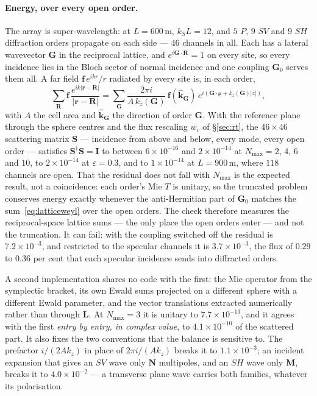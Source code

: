 \documentclass[11pt,a4paper]{article}
\begin{document}
\paragraph{Energy, over every open order.}  The array is super-wavelength:
at $L=600$\,m, $k_SL=12$, and $5$ $P$, $9$ $SV$ and $9$ $SH$ diffraction orders
propagate on each side --- $46$ channels in all.  Each has a lateral wavevector
$\mathbf{G}$ in the reciprocal lattice, and $e^{i\mathbf{G}\cdot\mathbf{R}}=1$ on
every site, so every incidence lies in the Bloch sector of normal incidence and
one coupling $\mathbf{G}_0$ serves them all.  A far field $\mathbf{f}\,e^{ikr}/r$
radiated by every site is, in each order,
\begin{equation}\label{eq:latticeweyl}
  \sum_{\mathbf{R}}\mathbf{f}\,\frac{e^{ik|\mathbf{r}-\mathbf{R}|}}{|\mathbf{r}-\mathbf{R}|}
  = \sum_{\mathbf{G}}\frac{2\pi i}{A\,k_z(\mathbf{G})}\,
    \mathbf{f}(\hat{\mathbf{k}}_{\mathbf{G}})\,
    e^{i(\mathbf{G}\cdot\boldsymbol{\rho}+k_z(\mathbf{G})|z|)},
\end{equation}
with $A$ the cell area and $\hat{\mathbf{k}}_{\mathbf{G}}$ the direction of order
$\mathbf{G}$.  With the reference plane through the sphere centres and the flux
rescaling $w_c$ of \S\ref{sec:rt}, the $46\times46$ scattering matrix
$\mathbf{S}$ --- incidence from above and below, every mode, every open order ---
satisfies $\mathbf{S}^{\dagger}\mathbf{S}=\mathbf{I}$ to between
$6\times10^{-16}$ and $2\times10^{-14}$ at $N_{\max}=2$, $4$, $6$ and $10$, to
$2\times10^{-14}$ at $\varepsilon=0.3$, and to $1\times10^{-14}$ at $L=900$\,m,
where $118$ channels are open.  That the residual does not fall with $N_{\max}$
is the expected result, not a coincidence: each order's Mie $T$ is unitary, so the truncated
problem conserves energy exactly whenever the anti-Hermitian part of
$\mathbf{G}_0$ matches the sum~\eqref{eq:latticeweyl} over the open orders.  The
check therefore measures the reciprocal-space lattice sums --- the only place
the open orders enter --- and not the truncation.  It can fail: with the
coupling switched off the residual is $7.2\times10^{-3}$, and restricted to the
specular channels it is $3.7\times10^{-3}$, the flux of $0.29$ to $0.36$ per
cent that each specular incidence sends into diffracted orders.

A second implementation shares no code with the first: the Mie operator from the
symplectic bracket, its own Ewald sums projected on a different sphere with a
different Ewald parameter, and the vector translations extracted numerically
rather than through $\mathbf{L}$.  At $N_{\max}=3$ it is unitary to
$7.7\times10^{-13}$, and it agrees with the first \emph{entry by entry, in
complex value}, to $4.1\times10^{-10}$ of the scattered part.  It also fixes the
two conventions that the balance is sensitive to.  The prefactor
$i/(2Ak_z)$ in place of $2\pi i/(Ak_z)$ breaks it to $1.1\times10^{-3}$; an
incident expansion that gives an $SV$ wave only $\mathbf{N}$ multipoles, and an
$SH$ wave only $\mathbf{M}$, breaks it to $4.0\times10^{-2}$ --- a transverse
plane wave carries both families, whatever its polarisation.
\end{document}
